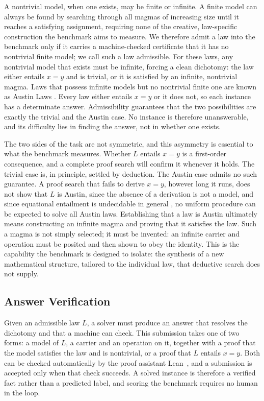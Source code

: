 \documentclass[letterpaper]{article} %
\begin{document}
A nontrivial model, when one exists, may be finite or infinite. A finite model can always be found by searching through all magmas of increasing size until it reaches a satisfying assignment, requiring none of the creative, law-specific construction the benchmark aims to measure. We therefore admit a law into the benchmark only if it carries a machine-checked certificate that it has no nontrivial finite model; we call such a law admissible. For these laws, any nontrivial model that exists must be infinite, forcing a clean dichotomy: the law either entails $x = y$ and is trivial, or it is satisfied by an infinite, nontrivial magma. Laws that possess infinite models but no nontrivial finite one are known as Austin Laws \citep{...}. Every law either entails $x = y$ or it does not, so each instance has a determinate answer. Admissibility guarantees that the two possibilities are exactly the trivial and the Austin case. No instance is therefore unanswerable, and its difficulty lies in finding the answer, not in whether one exists.

The two sides of the task are not symmetric, and this asymmetry is essential to what the benchmark measures. Whether $L$ entails $x = y$ is a first-order consequence, and a complete proof search will confirm it whenever it holds. The trivial case is, in principle, settled by deduction. The Austin case admits no such guarantee. A proof search that fails to derive $x = y$, however long it runs, does not show that $L$ is Austin, since the absence of a derivation is not a model, and since equational entailment is undecidable in general \citep{...}, no uniform procedure can be expected to solve all Austin laws. Establishing that a law is Austin ultimately means constructing an infinite magma and proving that it satisfies the law. Such a magma is not simply selected; it must be invented: an infinite carrier and operation must be posited and then shown to obey the identity. This is the capability the benchmark is designed to isolate: the synthesis of a new mathematical structure, tailored to the individual law, that deductive search does not supply. 

\subsection{Answer Verification}

Given an admissible law $L$, a solver must produce an answer that resolves the dichotomy and that a machine can check. This submission takes one of two forms: a model of $L$, a carrier and an operation on it, together with a proof that the model satisfies the law and is nontrivial, or a proof that $L$ entails $x = y$. Both can be checked automatically by the proof assistant Lean~\citep{...}, and a submission is accepted only when that check succeeds. A solved instance is therefore a verified fact
rather than a predicted label, and scoring the benchmark requires no human in the loop.
\end{document}
